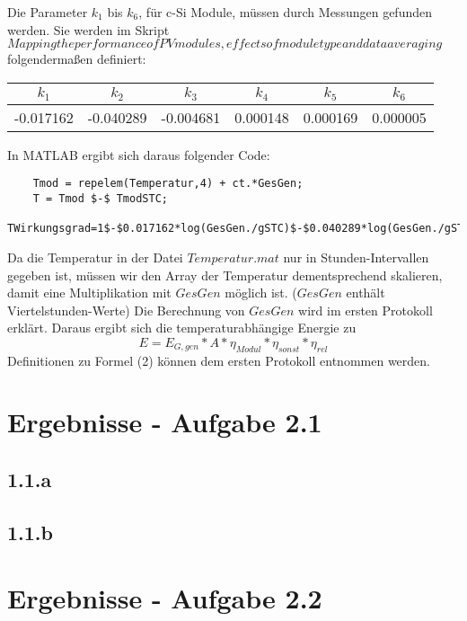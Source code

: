 \documentclass[a4paper,12pt]{article}
\begin{document}
	Die Parameter $k_1$ bis $k_6$, für c-Si Module, müssen durch Messungen gefunden werden. Sie werden im Skript $Mapping the performance of PV modules, effects of module type and data averaging$ folgendermaßen definiert:
	\begin{table}[H]
		\begin{tabular}{|l|c|c|c|c|c|}
			\hline
			\multicolumn{1}{|c|}{$k_1$} & $k_2$     & $k_3$     & $k_4$    & $k_5$    & $k_6$    \\ \hline
			-0.017162                   & -0.040289 & -0.004681 & 0.000148 & 0.000169 & 0.000005 \\ \hline
		\end{tabular}
	\end{table}
	In MATLAB ergibt sich daraus folgender Code:
	\begin{lstlisting}
	Tmod = repelem(Temperatur,4) + ct.*GesGen;
	T = Tmod $-$ TmodSTC;
	TWirkungsgrad=1$-$0.017162*log(GesGen./gSTC)$-$0.040289*log(GesGen./gSTC).^2$-$0.004681.*log(GesGen./gSTC).^3+0.000148.*log(GesGen./gSTC).^4+0.000169.*log(GesGen./gSTC).^5+0.000005.*T.^2;
	\end{lstlisting}
	Da die Temperatur in der Datei $Temperatur.mat$ nur in Stunden-Intervallen gegeben ist, müssen wir den Array der Temperatur dementsprechend skalieren, damit eine Multiplikation mit $GesGen$ möglich ist. ($GesGen$ enthält Viertelstunden-Werte)\newline
	Die Berechnung von $GesGen$ wird im ersten Protokoll erklärt.\newline
	Daraus ergibt sich die temperaturabhängige Energie zu
	\begin{equation}
	E=E_{G,gen}*A*\eta_{Modul}*\eta_{sonst}*\eta_{rel}
	\end{equation}
	Definitionen zu Formel (2) können dem ersten Protokoll entnommen werden.
	\newpage	
	\section{Ergebnisse - Aufgabe 2.1}
	\subsection{1.1.a}
	
	\subsection{1.1.b}

	\section{Ergebnisse - Aufgabe 2.2}
\end{document}
